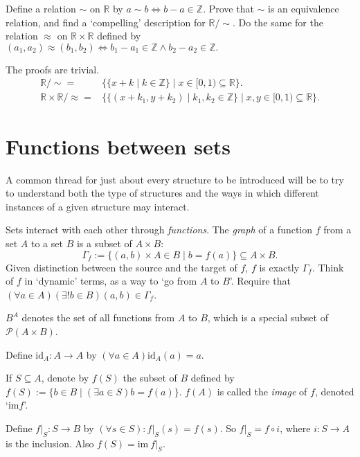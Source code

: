 \begin{exercise}
  Define a relation $\sim$ on $\mathbb{R}$ by $a\sim b \Leftrightarrow b-a\in\mathbb{Z}$. Prove that $\sim$ is an equivalence relation, and find a `compelling' description for $\mathbb{R}/\sim$. Do the same for the relation $\approx$ on $\mathbb{R}\times\mathbb{R}$ defined by $(a_1, a_2)\approx(b_1, b_2)\Leftrightarrow b_1-a_1\in\mathbb{Z}\wedge b_2-a_2\in\mathbb{Z}.$
\end{exercise}

The proofs are trivial.
\begin{align*}
  \mathbb{R}/\sim=                     & \{\{x+k\mid k\in \mathbb{Z}\}\mid x\in[0,1)\subseteq\mathbb{R}\}.                    \\
  \mathbb{R}\times \mathbb{R}/\approx= & \{\{(x+k_1,y+k_2)\mid k_1,k_2\in \mathbb{Z}\}\mid x,y\in[0,1)\subseteq \mathbb{R}\}.
\end{align*}

\section{Functions between sets}

A common thread for just about every structure to be introduced will be to try to understand both the type of structures and the ways in which diﬀerent instances of a given structure may interact.

Sets interact with each other through \textit{functions}. The \textit{graph} of a function $f$ from a set $A$ to a set $B$ is a subset of $A\times B$:
\[
  \Gamma_f:=\{(a,b)\times A\in B\mid b=f(a)\}\subseteq A\times B.
\]
Given distinction between the source and the target of $f$, $f$ is exactly $\Gamma_f$. Think of $f$ in `dynamic' terms, as a way to `go from $A$ to $B$'. Require that $(\forall a\in A)(\exists !b\in B)(a,b)\in \Gamma_f$.

$B^A$ denotes the set of all functions from $A$ to $B$, which is a special subset of $\mathcal{P}(A\times B)$.

Define $\mathrm{id}_A:A\rightarrow A$ by $(\forall a\in A)\mathrm{id}_A(a)=a$.

If $S\subseteq A$, denote by $f(S)$ the subset of $B$ defined by $f(S):=\{b\in B\mid(\exists a\in S)b=f(a)\}$. $f(A)$ is called the \textit{image} of $f$, denoted `$\mathrm{im}f$'.

Define $f|_{S}:S\rightarrow B$ by $(\forall s\in S):f|_{S}(s)=f(s)$. So $f|_S=f\circ i$, where $i:S\rightarrow A$ is the inclusion. Also $f(S)=\mathrm{im}\ f|_S$.

